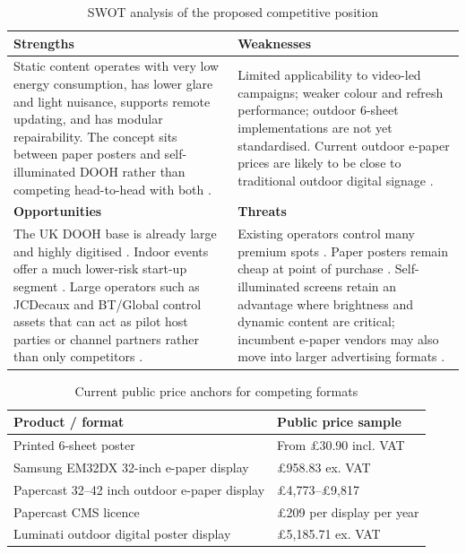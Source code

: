 \documentclass[11pt,a4paper]{article}
\renewcommand{\arraystretch}{1.12}
\begin{document}
\begin{table}[H]
\centering
\caption{SWOT analysis of the proposed competitive position}
\scriptsize
\renewcommand{\arraystretch}{1.08}
\begin{tabularx}{\textwidth}{Y Y}
\toprule
\textbf{Strengths} & \textbf{Weaknesses} \\
\midrule
Static content operates with very low energy consumption, has lower glare and light nuisance, supports remote updating, and has modular repairability. The concept sits between paper posters and self-illuminated DOOH rather than competing head-to-head with both \cite{ref1,ref2}. & Limited applicability to video-led campaigns; weaker colour and refresh performance; outdoor 6-sheet implementations are not yet standardised. Current outdoor e-paper prices are likely to be close to traditional outdoor digital signage \cite{ref7,ref8,ref9}. \\
\midrule
\textbf{Opportunities} & \textbf{Threats} \\
\midrule
The UK DOOH base is already large and highly digitised \cite{ref4,ref5}. Indoor events offer a much lower-risk start-up segment \cite{ref6}. Large operators such as JCDecaux and BT/Global control assets that can act as pilot host parties or channel partners rather than only competitors \cite{ref10,ref11}. & Existing operators control many premium spots \cite{ref10,ref11}. Paper posters remain cheap at point of purchase \cite{ref12}. Self-illuminated screens retain an advantage where brightness and dynamic content are critical; incumbent e-paper vendors may also move into larger advertising formats \cite{ref7,ref8,ref9}. \\
\bottomrule
\end{tabularx}
\end{table}

\begin{table}[H]
\centering
\caption{Current public price anchors for competing formats}
\footnotesize
\begin{tabularx}{\textwidth}{Y L{5.2cm}}
\toprule
\textbf{Product / format} & \textbf{Public price sample} \\
\midrule
Printed 6-sheet poster & From \pounds{}30.90 incl. VAT \cite{ref12} \\
Samsung EM32DX 32-inch e-paper display & \pounds{}958.83 ex. VAT \cite{ref7} \\
Papercast 32--42 inch outdoor e-paper display & \pounds{}4,773--\pounds{}9,817 \cite{ref8} \\
Papercast CMS licence & \pounds{}209 per display per year \cite{ref8} \\
Luminati outdoor digital poster display & \pounds{}5,185.71 ex. VAT \cite{ref9} \\
\bottomrule
\end{tabularx}
\end{table}
\end{document}
